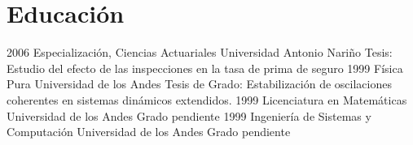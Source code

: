 \section{Educación}
\begin{entrylist}
  \entry
     {2006}
	{Especialización, Ciencias Actuariales}
	{Universidad Antonio Nariño}
	{Tesis: Estudio del efecto de las inspecciones en la tasa de prima de seguro}
  \entry
	{1999}
	{Física Pura}
	{Universidad de los Andes}
	{Tesis de Grado: Estabilización de oscilaciones coherentes en sistemas dinámicos extendidos.}
  \entry
	{1999}
	{Licenciatura en Matemáticas}
	{Universidad de los Andes}
	{Grado pendiente}
  \entry
	{1999}
	{Ingeniería de Sistemas y Computación}
	{Universidad de los Andes}
	{Grado pendiente}
\end{entrylist}
